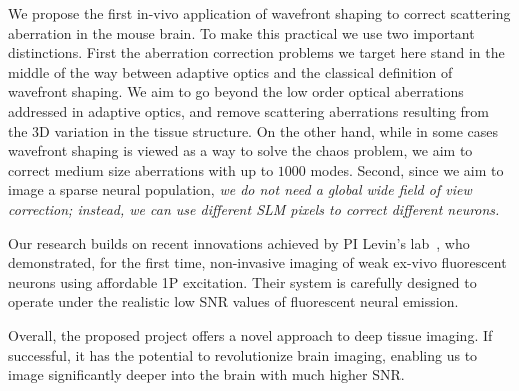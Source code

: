  
 We propose the first in-vivo application of wavefront shaping to correct scattering aberration in the mouse brain. 
 To make this practical we use two important distinctions. First the aberration correction problems we target here stand in the middle of the way between adaptive optics and the classical definition of wavefront shaping. We aim to go beyond the low order optical aberrations addressed in adaptive optics, and remove  scattering aberrations resulting from the 3D variation in the tissue structure. On the other hand, while in some cases wavefront shaping is viewed as a way to solve the chaos problem, we aim to correct medium size aberrations with up to $1000$  modes.
 Second, since we aim to image a sparse neural population, {\em we do not need a global wide field of view correction; instead, we can use different SLM pixels to correct different neurons.}
 
 Our research builds on recent innovations achieved by PI Levin's lab~\cite{DrorNatureComm24}, who demonstrated, for the first time, non-invasive imaging of weak ex-vivo fluorescent neurons using affordable 1P excitation. Their system is carefully designed to operate under the realistic low SNR values of fluorescent neural emission.
  
Overall, the proposed project offers a novel approach to deep tissue imaging. If successful, it has the potential to revolutionize brain imaging, enabling us to image significantly deeper into the brain with much higher SNR.
 
